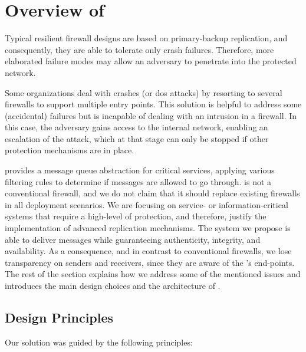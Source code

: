 \section{Overview of \sieveq}
\label{architecture}

Typical resilient firewall designs are based on primary-backup replication, and consequently, they are able to tolerate only crash failures.
Therefore, more elaborated failure modes may allow an adversary to penetrate into the protected network.


Some organizations deal with crashes (or \gls{dos} attacks) by resorting to several firewalls to support multiple entry points. 
This solution is helpful to address some (accidental) failures but is incapable of dealing with an intrusion in a firewall.
In this case, the adversary gains access to the internal network, enabling an escalation of the attack, which at that stage can only be stopped if other protection mechanisms are in place.

\sieveq provides a message queue abstraction for critical services, applying various filtering rules to determine if messages are allowed to go through.
\sieveq is not a conventional firewall, and we do not claim that it should replace existing firewalls in all deployment scenarios.
We are focusing on service- or information-critical systems that require a high-level of protection, and therefore, justify the implementation of advanced replication mechanisms.
The system we propose is able to deliver messages while guaranteeing authenticity, integrity, and availability.
As a consequence, and in contrast to conventional firewalls, we lose transparency on senders and receivers, since they are aware of the \sieveq's end-points.
The rest of the section explains how we address some of the mentioned issues and introduces the main design choices and the architecture of \sieveq.

\subsection{Design Principles}
Our solution was guided by the following  principles:

